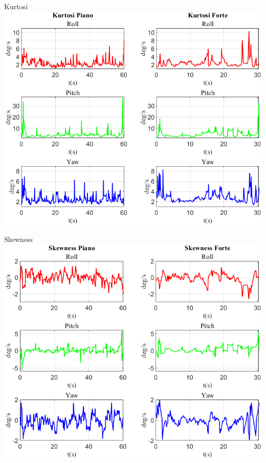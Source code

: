 	\begin{frame}{{Kurtosi}}
		\centering\includegraphics[height=.8\textheight]{figure/VAng/Kurtosi}
	\end{frame}
	
	\begin{frame}{{Skewness}}
		\centering\includegraphics[height=.8\textheight]{figure/VAng/Skewness}
	\end{frame}
	
